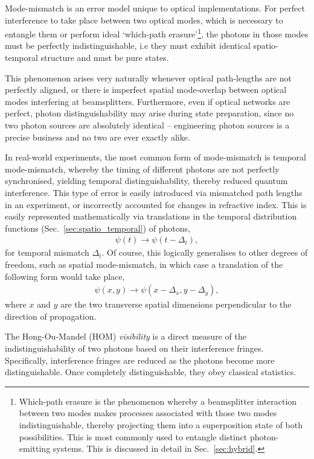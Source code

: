 Mode-mismatch is an error model unique to optical implementations. For perfect interference to take place between two optical modes, which is necessary to entangle them or perform ideal `which-path erasure'\footnote{Which-path erasure is the phenomenon whereby a beamsplitter interaction between two modes makes processes associated with those two modes indistinguishable, thereby projecting them into a superposition state of both possibilities. This is most commonly used to entangle distinct photon-emitting systems. This is discussed in detail in Sec.~\ref{sec:hybrid}.}, the photons in those modes must be perfectly indistinguishable, i.e they must exhibit identical spatio-temporal structure \cite{bib:RohdeMauererSilberhorn07} and must be pure states.

This phenomenon arises very naturally whenever optical path-lengths are not perfectly aligned, or there is imperfect spatial mode-overlap between optical modes interfering at beamsplitters. Furthermore, even if optical networks are perfect, photon distinguishability may arise during state preparation, since no two photon sources are absolutely identical -- engineering photon sources is a precise business and no two are ever exactly alike.

In real-world experiments, the most common form of mode-mismatch is temporal mode-mismatch, whereby the timing of different photons are not perfectly synchronised, yielding temporal distinguishability, thereby reduced quantum interference. This type of error is easily introduced via mismatched path lengths in an experiment, or incorrectly accounted for changes in refractive index. This is easily represented mathematically via translations in the temporal distribution functions (Sec.~\ref{sec:spatio_temporal}) of photons,
\begin{align} \label{eq:mode_mismatch_shift}
\psi(t) \to \psi(t-\Delta_t),
\end{align}
for temporal mismatch $\Delta_t$. Of course, this logically generalises to other degrees of freedom, such as spatial mode-mismatch, in which case a translation of the following form would take place,
\begin{align}
\psi(x,y) \to \psi(x-\Delta_x,y-\Delta_y),
\end{align}
where $x$ and $y$ are the two transverse spatial dimensions perpendicular to the direction of propagation.

The Hong-Ou-Mandel (HOM) \cite{bib:HOM87} \textit{visibility} is a direct measure of the indistinguishability of two photons based on their interference fringes. Specifically, interference fringes are reduced as the photons become more distinguishable. Once completely distinguishable, they obey classical statistics.

